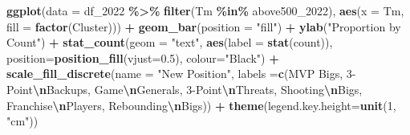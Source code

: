 \documentclass[
]{article}
\newenvironment{Shaded}{\begin{snugshade}}{\end{snugshade}}
\newcommand{\AttributeTok}[1]{\textcolor[rgb]{0.13,0.29,0.53}{#1}}
\newcommand{\DecValTok}[1]{\textcolor[rgb]{0.00,0.00,0.81}{#1}}
\newcommand{\FloatTok}[1]{\textcolor[rgb]{0.00,0.00,0.81}{#1}}
\newcommand{\FunctionTok}[1]{\textcolor[rgb]{0.13,0.29,0.53}{\textbf{#1}}}
\newcommand{\NormalTok}[1]{#1}
\newcommand{\SpecialCharTok}[1]{\textcolor[rgb]{0.81,0.36,0.00}{\textbf{#1}}}
\newcommand{\StringTok}[1]{\textcolor[rgb]{0.31,0.60,0.02}{#1}}
\begin{document}
\begin{Shaded}
\begin{Highlighting}[]
\FunctionTok{ggplot}\NormalTok{(}\AttributeTok{data =}\NormalTok{ df\_2022 }\SpecialCharTok{\%\textgreater{}\%} \FunctionTok{filter}\NormalTok{(Tm }\SpecialCharTok{\%in\%}\NormalTok{ above500\_2022), }\FunctionTok{aes}\NormalTok{(}\AttributeTok{x =}\NormalTok{ Tm, }\AttributeTok{fill =} \FunctionTok{factor}\NormalTok{(Cluster))) }\SpecialCharTok{+}
  \FunctionTok{geom\_bar}\NormalTok{(}\AttributeTok{position =} \StringTok{"fill"}\NormalTok{) }\SpecialCharTok{+} \FunctionTok{ylab}\NormalTok{(}\StringTok{"Proportion by Count"}\NormalTok{) }\SpecialCharTok{+}
  \FunctionTok{stat\_count}\NormalTok{(}\AttributeTok{geom =} \StringTok{"text"}\NormalTok{, }
             \FunctionTok{aes}\NormalTok{(}\AttributeTok{label =} \FunctionTok{stat}\NormalTok{(count)),}
             \AttributeTok{position=}\FunctionTok{position\_fill}\NormalTok{(}\AttributeTok{vjust=}\FloatTok{0.5}\NormalTok{), }\AttributeTok{colour=}\StringTok{"Black"}\NormalTok{) }\SpecialCharTok{+}
      \FunctionTok{scale\_fill\_discrete}\NormalTok{(}\AttributeTok{name =} \StringTok{"New Position"}\NormalTok{, }\AttributeTok{labels =}\FunctionTok{c}\NormalTok{(}\StringTok{\textquotesingle{}MVP Bigs\textquotesingle{}}\NormalTok{, }\StringTok{\textquotesingle{}3{-}Point}\SpecialCharTok{\textbackslash{}n}\StringTok{Backups\textquotesingle{}}\NormalTok{, }\StringTok{\textquotesingle{}Game}\SpecialCharTok{\textbackslash{}n}\StringTok{Generals\textquotesingle{}}\NormalTok{, }\StringTok{\textquotesingle{}3{-}Point}\SpecialCharTok{\textbackslash{}n}\StringTok{Threats\textquotesingle{}}\NormalTok{, }\StringTok{\textquotesingle{}Shooting}\SpecialCharTok{\textbackslash{}n}\StringTok{Bigs\textquotesingle{}}\NormalTok{, }\StringTok{\textquotesingle{}Franchise}\SpecialCharTok{\textbackslash{}n}\StringTok{Players\textquotesingle{}}\NormalTok{, }\StringTok{\textquotesingle{}Rebounding}\SpecialCharTok{\textbackslash{}n}\StringTok{Bigs\textquotesingle{}}\NormalTok{))  }\SpecialCharTok{+}
  \FunctionTok{theme}\NormalTok{(}\AttributeTok{legend.key.height=}\FunctionTok{unit}\NormalTok{(}\DecValTok{1}\NormalTok{, }\StringTok{"cm"}\NormalTok{))}
\end{Highlighting}
\end{Shaded}
\end{document}
